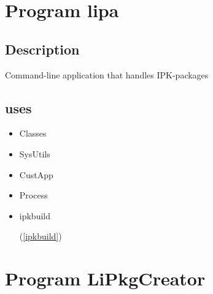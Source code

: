 \documentclass{report}
\begin{document}
\chapter{Program lipa}
\label{lipa}
\section{Description}
Command{-}line application that handles IPK{-}packages
\section{uses}
\begin{itemize}
\item \begin{ttfamily}Classes\end{ttfamily}\item \begin{ttfamily}SysUtils\end{ttfamily}\item \begin{ttfamily}CustApp\end{ttfamily}\item \begin{ttfamily}Process\end{ttfamily}\item \begin{ttfamily}ipkbuild\end{ttfamily}(\ref{ipkbuild})\end{itemize}
\chapter{Program LiPkgCreator}
\label{LiPkgCreator}
\end{document}
